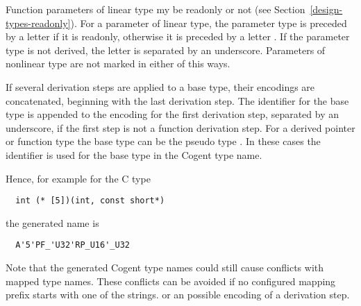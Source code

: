 Function parameters of linear type my be readonly or not (see Section~\ref{design-types-readonly}). For a 
parameter of linear type, the parameter type  is preceded by a letter  if it is readonly,
otherwise it is preceded by a letter . If the parameter type is not derived, the letter is separated
by an underscore. Parameters of nonlinear type are not marked in either of this ways.

If several derivation steps are applied to a base type, their encodings are concatenated, beginning with the 
last derivation step. The identifier for the base type is appended to the encoding for the first derivation step,
separated by an underscore, if the first step is not a function derivation step. For a derived pointer or 
function type the base type can be the pseudo type . In these cases the identifier  is
used for the base type in the Cogent type name.

Hence, for example for the C type
\begin{verbatim}
  int (* [5])(int, const short*)
\end{verbatim}
the generated name is
\begin{verbatim}
  A'5'PF_'U32'RP_U16'_U32
\end{verbatim}

Note that the generated Cogent type names could still cause conflicts with mapped type names. These conflicts can be
avoided if no configured mapping prefix starts with one of the  strings. 
or an possible encoding of a derivation step.
